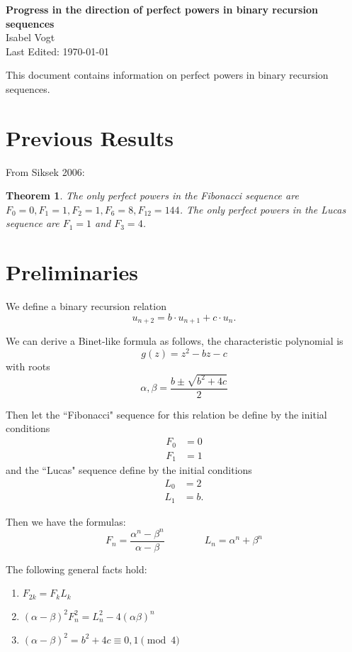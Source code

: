 \documentclass[12pt]{article}
\newtheorem{thm}{Theorem}[section]
\begin{document}
\begin{center}
{\bf \large{Progress in the direction of perfect powers in binary recursion sequences}} \\
\smallskip
Isabel Vogt\\
Last Edited: \today \\
\end{center}

This document contains information on perfect powers in binary recursion sequences.

\section{Previous Results}

From Siksek 2006:

\begin{thm}\label{fibluc}
The only perfect powers in the Fibonacci sequence are $F_0 = 0, F_1 = 1, F_2 = 1, F_6 = 8, F_{12} = 144$.  The only perfect powers in the Lucas sequence are $F_1 = 1$ and $F_3 = 4$. 
\end{thm}

\section{Preliminaries}

We define a binary recursion relation
\[ u_{n+2} = b\cdot u_{n+1}+ c\cdot u_n. \]

We can derive a Binet-like formula as follows, the characteristic polynomial is
\[ g(z) = z^2 - bz - c\]
with roots
\[ \alpha, \beta = \frac{b \pm \sqrt{b^2+4c}}{2} \]

Then let the ``Fibonacci" sequence for this relation be define by the initial conditions
\begin{align*}
F_0 &= 0 \\
F_1 & = 1 
\end{align*}
and the ``Lucas" sequence define by the initial conditions
\begin{align*}
L_0 &= 2 \\
L_1 & = b. 
\end{align*}

Then we have the formulas:
\[F_n = \frac{\alpha^n - \beta^n}{\alpha - \beta} \qquad \qquad L_n = \alpha^n +\beta^n \]

The following general facts hold:

\begin{enumerate}

\item $F_{2k} = F_kL_k$

\item $(\alpha - \beta)^2F_n^2 = L_n^2 - 4(\alpha\beta)^n$

\item $(\alpha - \beta)^2 = b^2+4c \equiv 0,1 \pmod{4}$

\end{enumerate}
\end{document}
